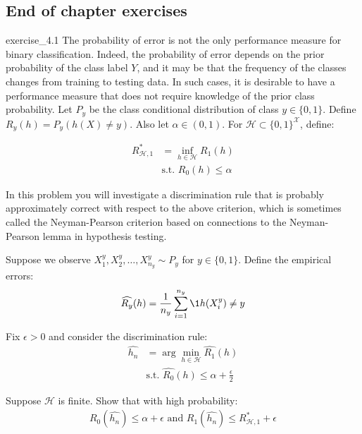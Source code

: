 \subsection{End of chapter exercises}
\begin{exercise}{}{exercise_4.1}
    The probability of error is not the only performance measure for binary classification. Indeed, the
    probability of error depends on the prior probability of the class label $Y$, and it may be that the
    frequency of the classes changes from training to testing data. In such cases, it is desirable to have a performance measure that does not require knowledge of the prior class probability. Let $P_y$ be the class conditional distribution of class $y\in\{0,1\}$. Define $R_y(h)=P_y(h(X) \ne y)$. Also let $\alpha \in (0,1)$. For $\mathcal{H}\subset\{0,1\}^{\mathcal{X}}$, define:

    \begin{align*}
        R^*_{\mathcal{H}, 1} &= \inf_{h\in\mathcal{H}} R_1(h) \\
        &\text{s.t. } R_0(h) \le \alpha 
    \end{align*}

    In this problem you will investigate a discrimination rule that is probably approximately correct with respect to the above criterion, which is sometimes called the Neyman-Pearson criterion based on connections to the Neyman-Pearson lemma in hypothesis testing.

    \noindent Suppose we observe $X_1^y, X_2^y, \dots, X_{n_y}^y \sim P_y$ for $y\in\{0,1\}$. Define the empirical errors:
    \begin{align*}
        \widehat{R_y}(h) = \frac{1}{n_y} \sum_{i=1}^{n_y} \1{h(X_i^y) \ne y}
    \end{align*}

    Fix $\epsilon > 0$ and consider the discrimination rule:
    \begin{align*}
        \widehat{h_n} &= \arg\min_{h\in\mathcal{H}} \widehat{R_1}(h) \\
        &\text{s.t. } \widehat{R_0}(h) \le \alpha + \frac{\epsilon}{2} 
    \end{align*}

    Suppose $\mathcal{H}$ is finite. Show that with high probability:
    \begin{align*}
        R_0(\widehat{h_n}) \le \alpha + \epsilon \text{ and } R_1(\widehat{h_n}) \le R^*_{\mathcal{H}, 1} + \epsilon
    \end{align*}
\end{exercise}